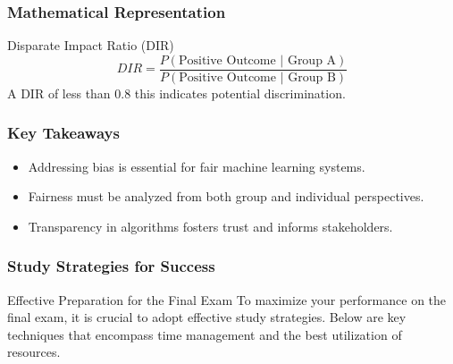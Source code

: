 \documentclass[aspectratio=169]{beamer}
\begin{document}
\begin{frame}[fragile]
    \frametitle{Mathematical Representation}
    \begin{block}{Disparate Impact Ratio (DIR)}
        \begin{equation}
        DIR = \frac{P(\text{Positive Outcome | Group A})}{P(\text{Positive Outcome | Group B})}
        \end{equation}
        A DIR of less than 0.8 this indicates potential discrimination.
    \end{block}
\end{frame}

\begin{frame}[fragile]
    \frametitle{Key Takeaways}
    \begin{itemize}
        \item Addressing bias is essential for fair machine learning systems.
        \item Fairness must be analyzed from both group and individual perspectives.
        \item Transparency in algorithms fosters trust and informs stakeholders.
    \end{itemize}
\end{frame}

\begin{frame}[fragile]
    \frametitle{Study Strategies for Success}
    \begin{block}{Effective Preparation for the Final Exam}
        To maximize your performance on the final exam, it is crucial to adopt effective study strategies. Below are key techniques that encompass time management and the best utilization of resources.
    \end{block}
\end{frame}
\end{document}
